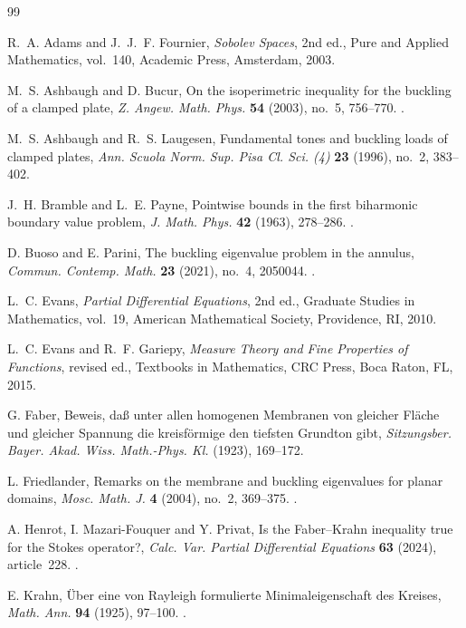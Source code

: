\documentclass[11pt,letterpaper,reqno]{amsart}
\theoremstyle{definition}
\begin{document}
\begin{thebibliography}{99}

R.~A. Adams and J.~J.~F. Fournier,
\emph{Sobolev Spaces}, 2nd ed.,
Pure and Applied Mathematics, vol.~140,
Academic Press, Amsterdam, 2003.

M.~S. Ashbaugh and D. Bucur,
On the isoperimetric inequality for the buckling of a clamped plate,
\emph{Z. Angew. Math. Phys.} \textbf{54} (2003), no.~5, 756--770.
.

M.~S. Ashbaugh and R.~S. Laugesen,
Fundamental tones and buckling loads of clamped plates,
\emph{Ann. Scuola Norm. Sup. Pisa Cl. Sci. (4)}
\textbf{23} (1996), no.~2, 383--402.

J.~H. Bramble and L.~E. Payne,
Pointwise bounds in the first biharmonic boundary value problem,
\emph{J. Math. Phys.} \textbf{42} (1963), 278--286.
.

D. Buoso and E. Parini,
The buckling eigenvalue problem in the annulus,
\emph{Commun. Contemp. Math.} \textbf{23} (2021), no.~4, 2050044.
.

L.~C. Evans,
\emph{Partial Differential Equations}, 2nd ed.,
Graduate Studies in Mathematics, vol.~19,
American Mathematical Society, Providence, RI, 2010.

L.~C. Evans and R.~F. Gariepy,
\emph{Measure Theory and Fine Properties of Functions}, revised ed.,
Textbooks in Mathematics, CRC Press, Boca Raton, FL, 2015.

G. Faber,
Beweis, da\ss{} unter allen homogenen Membranen von gleicher Fl\"ache
und gleicher Spannung die kreisf\"ormige den tiefsten Grundton gibt,
\emph{Sitzungsber. Bayer. Akad. Wiss. Math.-Phys. Kl.}
(1923), 169--172.

L. Friedlander,
Remarks on the membrane and buckling eigenvalues for planar domains,
\emph{Mosc. Math. J.} \textbf{4} (2004), no.~2, 369--375.
.

A. Henrot, I. Mazari-Fouquer and Y. Privat,
Is the Faber--Krahn inequality true for the Stokes operator?,
\emph{Calc. Var. Partial Differential Equations}
\textbf{63} (2024), article~228.
.

E. Krahn,
\"Uber eine von Rayleigh formulierte Minimaleigenschaft des Kreises,
\emph{Math. Ann.} \textbf{94} (1925), 97--100.
.


\end{thebibliography}
\end{document}

